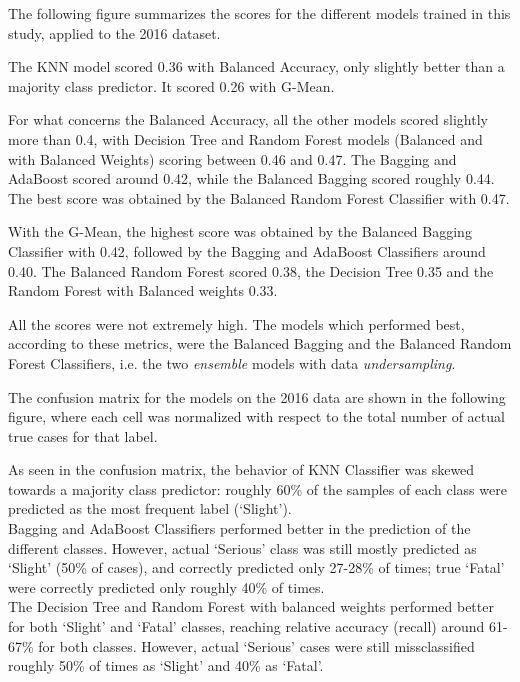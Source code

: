 \documentclass[11pt]{article}
\begin{document}
The following figure summarizes the scores for the different models trained in this study, applied to the 2016 dataset.

    \begin{center}
    \end{center}

The KNN model scored 0.36 with Balanced Accuracy, only slightly better than a majority class predictor. It scored 0.26 with G-Mean.

For what concerns the Balanced Accuracy, all the other models scored slightly more than 0.4, with Decision Tree and Random Forest models (Balanced and with Balanced Weights) scoring between 0.46 and 0.47. The Bagging and AdaBoost scored around 0.42, while the Balanced Bagging scored roughly 0.44. The best score was obtained by the Balanced Random Forest Classifier with 0.47.

With the G-Mean, the highest score was obtained by the Balanced Bagging Classifier with 0.42, followed by the Bagging and AdaBoost Classifiers around 0.40. The Balanced Random Forest scored 0.38, the Decision Tree 0.35 and the Random Forest with Balanced weights 0.33.

All the scores were not extremely high. The models which performed best, according to these metrics, were the Balanced Bagging and the Balanced Random Forest Classifiers, i.e. the two \textit{ensemble} models with data \textit{undersampling}.

The confusion matrix for the models on the 2016 data are shown in the following figure, where each cell was normalized with respect to the total number of actual true cases for that label.

    \begin{center}
    \end{center}

As seen in the confusion matrix, the behavior of KNN Classifier was skewed towards a majority class predictor: roughly 60\% of the samples of each class were predicted as the most frequent label (`Slight').\\
Bagging and AdaBoost Classifiers performed better in the prediction of the different classes. However, actual `Serious' class was still mostly predicted as `Slight' (50\% of cases), and correctly predicted only 27-28\% of times; true `Fatal' were correctly predicted only roughly 40\% of times.\\
The Decision Tree and Random Forest with balanced weights performed better for both `Slight' and `Fatal' classes, reaching relative accuracy (recall) around 61-67\% for both classes. However, actual `Serious' cases were still missclassified roughly 50\% of times as `Slight' and 40\% as `Fatal'.
\end{document}
